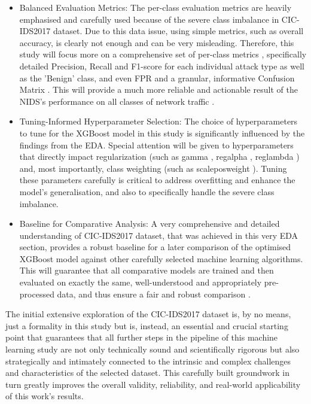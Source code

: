 \begin{itemize}[noitemsep]
\item Balanced Evaluation Metrics: The per-class evaluation metrics are heavily emphasised and carefully used because of the severe class imbalance in CIC-IDS2017 dataset. Due to this data issue, using simple metrics, such as overall accuracy, is clearly not enough and can be very misleading. Therefore, this study will focus more on a comprehensive set of per-class metrics , specifically detailed Precision, Recall and F1-score for each individual attack type as well as the 'Benign' class, and even FPR and a granular, informative Confusion Matrix . This will provide a much more reliable and actionable result of the NIDS's performance on all classes of network traffic \parencite{al2022cicids}.
\item Tuning-Informed Hyperparameter Selection: The choice of hyperparameters to tune for the XGBoost model in this study is significantly influenced by the findings from the EDA. Special attention will be given to hyperparameters that directly impact regularization (such as gamma , reg\textunderscore alpha , reg\textunderscore lambda ) and, most importantly, class weighting (such as scale\textunderscore pos\textunderscore weight ). Tuning these parameters carefully is critical to address overfitting and enhance the model's generalisation, and also to specifically handle the severe class imbalance.
\item Baseline for Comparative Analysis: A very comprehensive and detailed understanding of CIC-IDS2017 dataset, that was achieved in this very EDA section, provides a robust baseline for a later comparison of the optimised XGBoost model against other carefully selected machine learning algorithms. This will guarantee that all comparative models are trained and then evaluated on exactly the same, well-understood and appropriately pre-processed data, and thus ensure a fair and robust comparison \parencite{shafi2022comprehensive}.
\end{itemize} 
The initial extensive exploration of the CIC-IDS2017 dataset is, by no means, just a formality in this study but is, instead, an essential and crucial starting point that guarantees that all further steps in the pipeline of this machine learning study are not only technically sound and scientifically rigorous but also strategically and intimately connected to the intrinsic and complex challenges and characteristics of the selected dataset. This carefully built groundwork in turn greatly improves the overall validity, reliability, and real-world applicability of this work's results.

